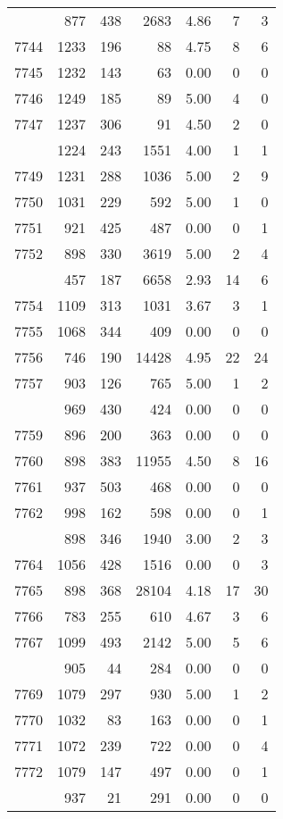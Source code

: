 \documentclass[
]{article}
\begin{document}
\begin{table}
\begin{tabular}[t]{lrrrrrr}
\addlinespace
7743 & 877 & 438 & 2683 & 4.86 & 7 & 3\\
7744 & 1233 & 196 & 88 & 4.75 & 8 & 6\\
7745 & 1232 & 143 & 63 & 0.00 & 0 & 0\\
7746 & 1249 & 185 & 89 & 5.00 & 4 & 0\\
7747 & 1237 & 306 & 91 & 4.50 & 2 & 0\\
\addlinespace
7748 & 1224 & 243 & 1551 & 4.00 & 1 & 1\\
7749 & 1231 & 288 & 1036 & 5.00 & 2 & 9\\
7750 & 1031 & 229 & 592 & 5.00 & 1 & 0\\
7751 & 921 & 425 & 487 & 0.00 & 0 & 1\\
7752 & 898 & 330 & 3619 & 5.00 & 2 & 4\\
\addlinespace
7753 & 457 & 187 & 6658 & 2.93 & 14 & 6\\
7754 & 1109 & 313 & 1031 & 3.67 & 3 & 1\\
7755 & 1068 & 344 & 409 & 0.00 & 0 & 0\\
7756 & 746 & 190 & 14428 & 4.95 & 22 & 24\\
7757 & 903 & 126 & 765 & 5.00 & 1 & 2\\
\addlinespace
7758 & 969 & 430 & 424 & 0.00 & 0 & 0\\
7759 & 896 & 200 & 363 & 0.00 & 0 & 0\\
7760 & 898 & 383 & 11955 & 4.50 & 8 & 16\\
7761 & 937 & 503 & 468 & 0.00 & 0 & 0\\
7762 & 998 & 162 & 598 & 0.00 & 0 & 1\\
\addlinespace
7763 & 898 & 346 & 1940 & 3.00 & 2 & 3\\
7764 & 1056 & 428 & 1516 & 0.00 & 0 & 3\\
7765 & 898 & 368 & 28104 & 4.18 & 17 & 30\\
7766 & 783 & 255 & 610 & 4.67 & 3 & 6\\
7767 & 1099 & 493 & 2142 & 5.00 & 5 & 6\\
\addlinespace
7768 & 905 & 44 & 284 & 0.00 & 0 & 0\\
7769 & 1079 & 297 & 930 & 5.00 & 1 & 2\\
7770 & 1032 & 83 & 163 & 0.00 & 0 & 1\\
7771 & 1072 & 239 & 722 & 0.00 & 0 & 4\\
7772 & 1079 & 147 & 497 & 0.00 & 0 & 1\\
\addlinespace
7773 & 937 & 21 & 291 & 0.00 & 0 & 0\\

\end{tabular}
\end{table}
\end{document}
